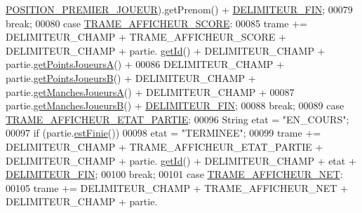 \begin{DoxyCode}
      \hyperlink{classcom_1_1example_1_1area_1_1_partie_a2f977d38424ff199a053d9e3cd4eb8c6}{POSITION\_PREMIER\_JOUEUR}).getPrenom() + \hyperlink{classcom_1_1example_1_1area_1_1_protocol_a_r_e_a_a77f13634749dc65bc24d98672ff7ba03}{DELIMITEUR\_FIN};
00079                 \textcolor{keywordflow}{break};
00080             \textcolor{keywordflow}{case} \hyperlink{classcom_1_1example_1_1area_1_1_protocol_a_r_e_a_a63ba437bfc08504af2caaec99d61a230}{TRAME\_AFFICHEUR\_SCORE}:
00085                 trame += DELIMITEUR\_CHAMP + TRAME\_AFFICHEUR\_SCORE + DELIMITEUR\_CHAMP + partie.
      \hyperlink{classcom_1_1example_1_1area_1_1_partie_a535a67141814a238c1ffc0c42d0afedc}{getId}() + DELIMITEUR\_CHAMP + partie.\hyperlink{classcom_1_1example_1_1area_1_1_partie_a5ec15306fc24648c1698ea0cdd50bf53}{getPointsJoueursA}() +
00086                         DELIMITEUR\_CHAMP + partie.\hyperlink{classcom_1_1example_1_1area_1_1_partie_a376bb79a67c311e1eb681387e9440bbd}{getPointsJoueursB}() + DELIMITEUR\_CHAMP +
       partie.\hyperlink{classcom_1_1example_1_1area_1_1_partie_a7c863edbbdd07ddc7f71616949823201}{getManchesJoueursA}() + DELIMITEUR\_CHAMP +
00087                         partie.\hyperlink{classcom_1_1example_1_1area_1_1_partie_a706fa101c4fcad9f2ea6473b5778b55e}{getManchesJoueursB}() + 
      \hyperlink{classcom_1_1example_1_1area_1_1_protocol_a_r_e_a_a77f13634749dc65bc24d98672ff7ba03}{DELIMITEUR\_FIN};
00088                 \textcolor{keywordflow}{break};
00089             \textcolor{keywordflow}{case} \hyperlink{classcom_1_1example_1_1area_1_1_protocol_a_r_e_a_a685ef5127e28517ca42fafb5cd6ba25a}{TRAME\_AFFICHEUR\_ETAT\_PARTIE}:
00096                 String etat = \textcolor{stringliteral}{"EN\_COURS"};
00097                 \textcolor{keywordflow}{if} (partie.\hyperlink{classcom_1_1example_1_1area_1_1_partie_a00890390c78922c024fe31065923964e}{estFinie}())
00098                     etat = \textcolor{stringliteral}{"TERMINEE"};
00099                 trame += DELIMITEUR\_CHAMP + TRAME\_AFFICHEUR\_ETAT\_PARTIE + DELIMITEUR\_CHAMP + partie.
      \hyperlink{classcom_1_1example_1_1area_1_1_partie_a535a67141814a238c1ffc0c42d0afedc}{getId}() + DELIMITEUR\_CHAMP + etat + \hyperlink{classcom_1_1example_1_1area_1_1_protocol_a_r_e_a_a77f13634749dc65bc24d98672ff7ba03}{DELIMITEUR\_FIN};
00100                 \textcolor{keywordflow}{break};
00101             \textcolor{keywordflow}{case} \hyperlink{classcom_1_1example_1_1area_1_1_protocol_a_r_e_a_a33bebef0a070831f8853b3f9e88532f2}{TRAME\_AFFICHEUR\_NET}:
00105                 trame += DELIMITEUR\_CHAMP + TRAME\_AFFICHEUR\_NET + DELIMITEUR\_CHAMP + partie.

\end{DoxyCode}
